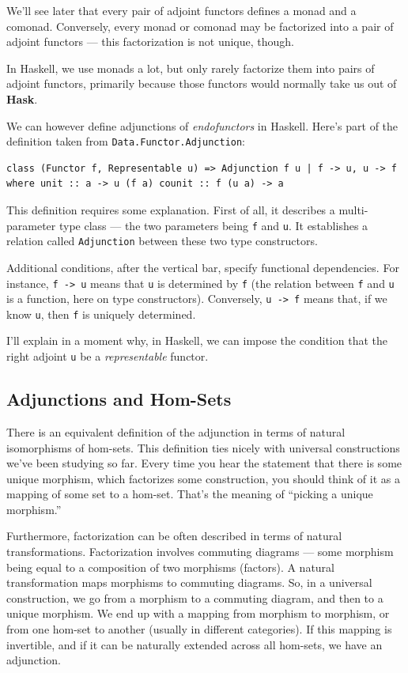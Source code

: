 We'll see later that every pair of adjoint functors defines a monad and
a comonad. Conversely, every monad or comonad may be factorized into a
pair of adjoint functors --- this factorization is not unique, though.

In Haskell, we use monads a lot, but only rarely factorize them into
pairs of adjoint functors, primarily because those functors would
normally take us out of \textbf{Hask}.

We can however define adjunctions of \emph{endofunctors} in Haskell.
Here's part of the definition taken from
\texttt{Data.Functor.Adjunction}:

\begin{verbatim}
class (Functor f, Representable u) => Adjunction f u | f -> u, u -> f where unit :: a -> u (f a) counit :: f (u a) -> a 
\end{verbatim}

This definition requires some explanation. First of all, it describes a
multi-parameter type class --- the two parameters being \texttt{f} and
\texttt{u}. It establishes a relation called \texttt{Adjunction} between
these two type constructors.

Additional conditions, after the vertical bar, specify functional
dependencies. For instance, \texttt{f\ -\textgreater{}\ u} means that
\texttt{u} is determined by \texttt{f} (the relation between \texttt{f}
and \texttt{u} is a function, here on type constructors). Conversely,
\texttt{u\ -\textgreater{}\ f} means that, if we know \texttt{u}, then
\texttt{f} is uniquely determined.

I'll explain in a moment why, in Haskell, we can impose the condition
that the right adjoint \texttt{u} be a \emph{representable} functor.

\subsection{Adjunctions and Hom-Sets}\label{adjunctions-and-hom-sets}

There is an equivalent definition of the adjunction in terms of natural
isomorphisms of hom-sets. This definition ties nicely with universal
constructions we've been studying so far. Every time you hear the
statement that there is some unique morphism, which factorizes some
construction, you should think of it as a mapping of some set to a
hom-set. That's the meaning of ``picking a unique morphism.''

Furthermore, factorization can be often described in terms of natural
transformations. Factorization involves commuting diagrams --- some
morphism being equal to a composition of two morphisms (factors). A
natural transformation maps morphisms to commuting diagrams. So, in a
universal construction, we go from a morphism to a commuting diagram,
and then to a unique morphism. We end up with a mapping from morphism to
morphism, or from one hom-set to another (usually in different
categories). If this mapping is invertible, and if it can be naturally
extended across all hom-sets, we have an adjunction.

